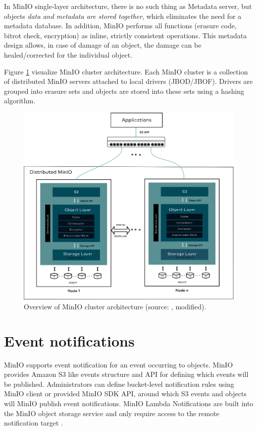     In MinIO single-layer architecture, there is no such thing as Metadata server, but objects \textit{data and metadata are stored together}, which eliminates the need for a metadata database. In addition, MinIO performs all functions (erasure code, bitrot check, encryption) as inline, strictly consistent operations. This metadata design allows, in case of damage of an object, the damage can be healed/corrected for the individual object\cite{minioHighPerformance}.

    Figure \ref{fig:minio-architecture} visualize MinIO cluster architecture. Each MinIO cluster is a collection of distributed MinIO servers attached to local drivers (JBOD/JBOF). Drivers are grouped into erasure sets and objects are stored into these sets using a hashing algorithm\cite{minioObjectStorage}.

    \begin{figure}[H]
        \centering
        \includegraphics[angle=90, height=0.75\textheight]{obrazky-figures/minio-architecture.eps}
        \caption{Overview of MinIO cluster architecture (source: \cite{minioObjectStorage}, modified).}
        \label{fig:minio-architecture}
    \end{figure}
    \newpage


    \section{Event notifications}
    MinIO supports event notification for an event occurring to objects. MinIO provides Amazon S3 like events structure and API for defining which events will be published. Administrators can define bucket-level notification rules using MinIO client or provided MinIO SDK API, around which S3 events and objects will MinIO publish event notifications. MinIO Lambda Notifications are built into the MinIO object storage service and only require access to the remote notification target \cite{minioMonitoring}.

